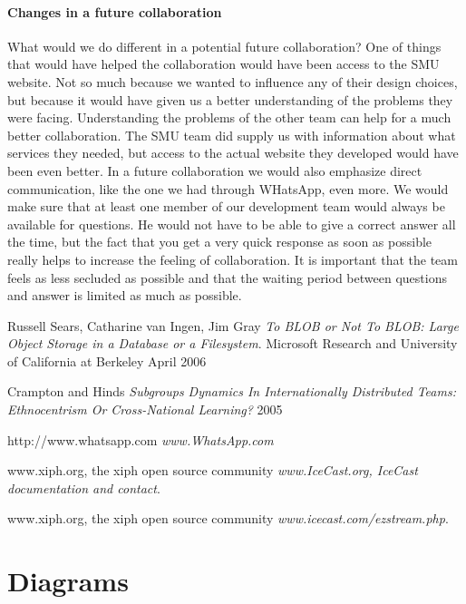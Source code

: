 \documentclass[a4paper,11pt,report]{article}
\begin{document}
{\paragraph{Changes in a future collaboration}
What would we do different in a potential future collaboration? One of things that would have helped the collaboration would have been access to the SMU website. Not so much because we wanted to influence any of their design choices, but because it would have given us a better understanding of the problems they were facing. Understanding the problems of the other team can help for a much better collaboration. The SMU team did supply us with information about what services they needed, but access to the actual website they developed would have been even better. In a future collaboration we would also emphasize direct communication, like the one we had through WHatsApp, even more. We would make sure that at least one member of our development team would always be available for questions. He would not have to be able to give a correct answer all the time, but the fact that you get a very quick response as soon as possible really helps to increase the feeling of collaboration. It is important that the team feels as less secluded as possible and that the waiting period between questions and answer is limited as much as possible. 

\begin{thebibliography}{9}
  Russell Sears, Catharine van Ingen, Jim Gray
  \emph{To BLOB or Not To BLOB: 
Large Object Storage in a Database or a Filesystem}.
  Microsoft Research and University of California at Berkeley
  April 2006
  
 Crampton and Hinds \emph{Subgroups Dynamics In
Internationally Distributed
Teams: Ethnocentrism Or
Cross-National Learning? } 2005
	
 http://www.whatsapp.com \emph{www.WhatsApp.com}
	
  www.xiph.org, the xiph open source community
  \emph{www.IceCast.org, IceCast documentation and contact}.
    
  www.xiph.org, the xiph open source community
  \emph{www.icecast.com/ezstream.php}.
\end{thebibliography}
\newpage
\appendix
\section{Diagrams}

}
\end{document}
